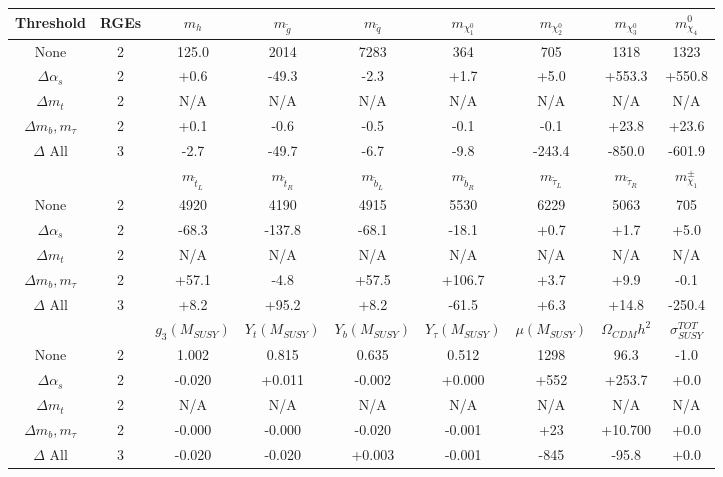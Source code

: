 \begin{table}
\begin{center}
\begin{tabular}{|c|c|ccccccc|}\hline
Threshold & RGEs  & $m_h$  & $m_{\tilde g}$ & $m_{{\tilde q}}$ & $m_{\chi_1^0}$  & $m_{\chi_2^0}$ & $m_{\chi_3^0}$ & $m_{\chi_4}^0$ \\ \hline
None               & 2 & 125.0 & 2014 & 7283 &  364 &  705 & 1318 &1323\\
$\Delta \alpha_s$  & 2 &  +0.6 & -49.3 &  -2.3 &  +1.7 &  +5.0 & +553.3 &+550.8\\
$\Delta m_t$      & 2 & N/A & N/A & N/A & N/A & N/A & N/A & N/A  \\
$\Delta m_b, m_\tau$& 2 &  +0.1 &  -0.6 &  -0.5 &  -0.1 &  -0.1 & +23.8 &+23.6\\
$\Delta$ All      & 3 &  -2.7 & -49.7 &  -6.7 &  -9.8 & -243.4 & -850.0 &-601.9\\

%
\hline&& $m_{{\tilde t}_L}$  & $m_{{\tilde t}_R}$ &$m_{{\tilde b}_L}$&$m_{{\tilde b}_R}$&$m_{{\tilde \tau}_L}$&$m_{{\tilde \tau}_R}$&$m_{\chi_1}^\pm$ \\ \hline
None             & 2 &4920 & 4190 & 4915 & 5530 & 6229 & 5063 & 705\\
$\Delta \alpha_s$  & 2 & -68.3 & -137.8 & -68.1 & -18.1 &  +0.7 &  +1.7 & +5.0\\
$\Delta m_t$      & 2 & N/A & N/A & N/A & N/A & N/A & N/A & N/A \\
$\Delta m_b, m_\tau$& 2 & +57.1 &  -4.8 & +57.5 & +106.7 &  +3.7 &  +9.9 & -0.1\\
$\Delta$ All      & 3 &  +8.2 & +95.2 &  +8.2 & -61.5 &  +6.3 & +14.8 &-250.4\\

%
\hline      &  & $g_3(M_{SUSY})$ & $Y_t(M_{SUSY})$ &  $Y_b(M_{SUSY})$ & $Y_\tau(M_{SUSY})$  & $\mu(M_{SUSY})$    & $\Omega_{CDM} h^2$ & $\sigma_{SUSY}^{TOT}$\\ \hline
 None                   & 2 & 1.002 & 0.815 & 0.635 & 0.512 & 1298 &  96.3 &  -1.0\\
$\Delta \alpha_s$  & 2 & -0.020 & +0.011 & -0.002 & +0.000 & +552 & +253.7 &  +0.0\\
$\Delta m_t$      & 2 & N/A & N/A & N/A & N/A & N/A & N/A& N/A\\
$\Delta m_b, m_\tau$& 2 & -0.000 & -0.000 & -0.020 & -0.001 &  +23 & +10.700 &  +0.0\\
$\Delta$ All      & 3 & -0.020 & -0.020 & +0.003 & -0.001 & -845 & -95.8 & +0.0\\


\end{tabular}
\end{center}
\end{table}
